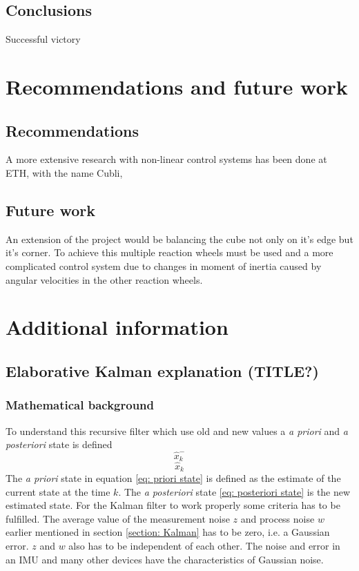 \documentclass[a4paper,11pt]{kth-mag}
\begin{document}
\section{Conclusions}
Successful victory


\chapter{Recommendations and future work}

\section{Recommendations}
A more extensive research with non-linear control systems has been done at ETH, with the name Cubli,\cite{cubliECC13}

\section{Future work}
An extension of the project would be balancing the cube not only on it's edge but it's corner. To achieve this multiple reaction wheels must be used and a more complicated control system due to changes in moment of inertia caused by angular velocities in the other reaction wheels.

%
\cleardoublepage


\cleardoublepage
\appendix
{}


\chapter{Additional information} \label{appA}
\section{Elaborative Kalman explanation (TITLE?)} \label{app: Kalman}
\subsection{Mathematical background}
To understand this recursive filter which use old and new values a \textit{a priori} and \textit{a posteriori} state is defined
\begin{equation} \label{eq: priori state}
\hat{x}^-_k
\end{equation}
\begin{equation} \label{eq: posteriori state}
\hat{x}_k
\end{equation}
The \textit{a priori}  state in equation \eqref{eq: priori state} is defined as the estimate of the current state at the time $k$. The \textit{a posteriori} state \eqref{eq: posteriori state} is the new estimated state.
For the Kalman filter to work properly some criteria has to be fulfilled. The average value of the measurement noise $z$ and process noise $w$ earlier mentioned in section \ref{section: Kalman} has to be zero, i.e. a Gaussian error. $z$ and $w$ also has to be independent of  each other. The noise and error in an IMU and many other devices have the characteristics of Gaussian noise.
\end{document}
